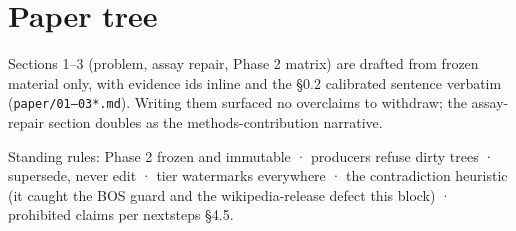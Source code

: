 \documentclass[10pt]{article}
\begin{document}
\section{Paper tree}

Sections 1--3 (problem, assay repair, Phase 2 matrix) are drafted from
frozen material only, with evidence ids inline and the \S0.2 calibrated
sentence verbatim (\texttt{paper/01--03*.md}). Writing them surfaced no
overclaims to withdraw; the assay-repair section doubles as the
methods-contribution narrative.

\vspace{0.6em}
\noindent\textcolor{muted}{\footnotesize Standing rules: Phase 2 frozen
and immutable · producers refuse dirty trees · supersede, never edit ·
tier watermarks everywhere · the contradiction heuristic (it caught the
BOS guard and the wikipedia-release defect this block) · prohibited
claims per nextsteps \S4.5.}
\end{document}
